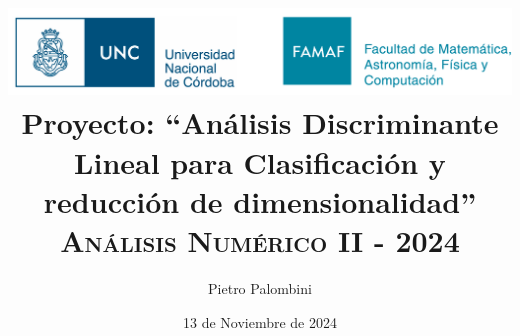 \documentclass[a4paper,12pt]{article}
\begin{document}
\title{
\includegraphics[scale=0.3]{logo_UNC-FAMAF.png} \\
Proyecto: ``Análisis Discriminante Lineal para Clasificación y reducción de dimensionalidad'' \\
\textsc{\footnotesize Análisis Numérico II - 2024}
}
\author{Pietro Palombini}
\date{13 de Noviembre de 2024}
\maketitle









\end{document}
